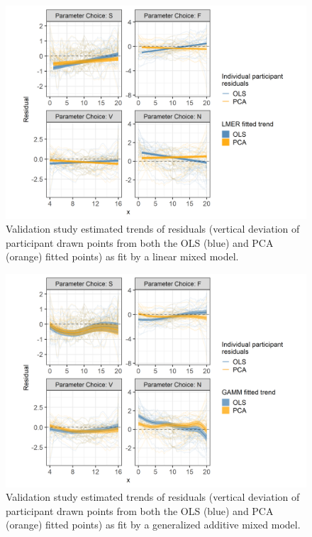 \documentclass[
  letterpaper,
  DIV=11,
  numbers=noendperiod]{scrartcl}
\begin{document}
\begin{figure}[ht]
\begin{center}
\centerline{\includegraphics[width=\columnwidth]{images/eyefitting-lmer-plot}}
\caption{Validation study estimated trends of residuals (vertical deviation of participant drawn points from both the OLS (blue) and PCA (orange) fitted points) as fit by a linear mixed model.}
\label{eyefitting-lmer-plot}
\end{center}
\end{figure}

\begin{figure}[ht]
\begin{center}
\centerline{\includegraphics[width=\columnwidth]{images/eyefitting-gamm-plot}}
\caption{Validation study estimated trends of residuals (vertical deviation of participant drawn points from both the OLS (blue) and PCA (orange) fitted points) as fit by a generalized additive mixed model.}
\label{eyefitting-gamm-plot}
\end{center}
\end{figure}
\end{document}
